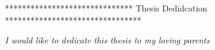 ****************************** Thesis Dedidcation ********************************

\begin{dedication} 

\textit{I would like to dedicate this thesis to my loving parents} 

\end{dedication}

